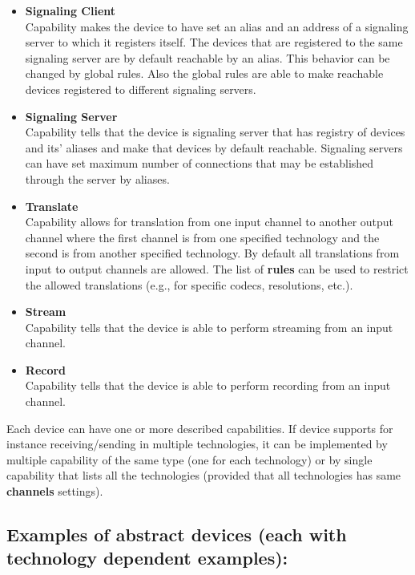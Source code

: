 \begin{itemize}
\item \textbf{Signaling Client} \\
  Capability makes the device to have set an alias 
  and an address of a signaling server to which it registers itself.
  The devices that are registered to the same signaling server are by
  default reachable by an alias. This behavior can be changed by global rules. 
  Also the global rules are able to make reachable devices registered to 
  different signaling servers.

\item \textbf{Signaling Server} \\
  Capability tells that the device is signaling server
  that has registry of devices and its' aliases and make that devices by 
  default reachable. Signaling servers can have set maximum number of 
  connections that may be established through the server by aliases.

\item \textbf{Translate}  \\
  Capability allows for translation from one input channel to another output 
  channel where the first channel is from one specified technology and the 
  second is from another specified technology. By default all translations 
  from input to output channels are allowed. The list of \textbf{rules} can be 
  used to restrict the allowed translations (e.g., for specific codecs, 
  resolutions, etc.).

\item \textbf{Stream}  \\
  Capability tells that the device is able to perform streaming from an input 
  channel.

\item \textbf{Record}  \\
  Capability tells that the device is able to perform recording from an input 
  channel.
\end{itemize}

Each device can have one or more described capabilities. If device supports 
for instance receiving/sending in multiple technologies, it can be implemented 
by multiple capability of the same type (one for each technology) or by single 
capability that lists all the technologies (provided that all technologies has 
same \textbf{channels} settings).

\subsection*{Examples of abstract devices (each with technology dependent 
             examples):}

